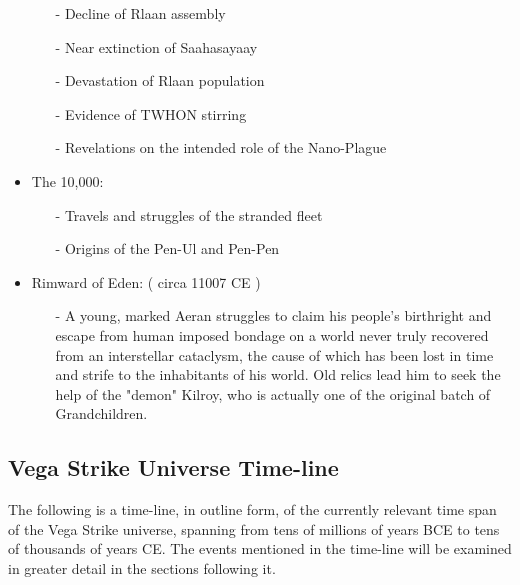 \begin{itemize}
\begin{itemize}
\item	[-] Decline of Rlaan assembly
\item	[-] Near extinction of Saahasayaay
\item	[-] Devastation of Rlaan population
\item	[-] Evidence of TWHON stirring
\item	[-] Revelations on the intended role of the Nano-Plague
\end{itemize}
\item	The 10,000:
\begin{itemize}
\item	[-] Travels and struggles of the stranded fleet
\item	[-] Origins of the Pen-Ul and Pen-Pen
\end{itemize}
\item	Rimward of Eden: ( circa 11007 CE )
\begin{itemize}
\item [-] A young, marked Aeran struggles to claim his people's
birthright and escape from human imposed bondage on a world never
truly recovered from an interstellar cataclysm, the cause of which has
been lost in time and strife to the inhabitants of his world. Old
relics lead him to seek the help of the "demon" Kilroy, who is
actually one of the original batch of Grandchildren.
\end{itemize}
\end{itemize}

\subsection{Vega Strike Universe Time-line}
\label{TimelineOutline}
The following is a time-line, in outline form, of the currently
relevant time span of the Vega Strike universe, spanning from tens of
millions of years BCE to tens of thousands of years CE. The events
mentioned in the time-line will be examined in greater detail in the
sections following it.

